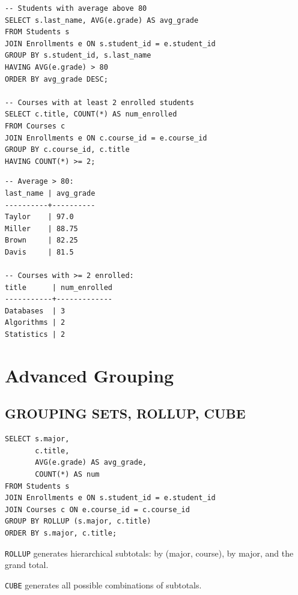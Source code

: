 \begin{codeblock}[title=\textbf{Filtering with HAVING}]
\begin{verbatim}
-- Students with average above 80
SELECT s.last_name, AVG(e.grade) AS avg_grade
FROM Students s
JOIN Enrollments e ON s.student_id = e.student_id
GROUP BY s.student_id, s.last_name
HAVING AVG(e.grade) > 80
ORDER BY avg_grade DESC;

-- Courses with at least 2 enrolled students
SELECT c.title, COUNT(*) AS num_enrolled
FROM Courses c
JOIN Enrollments e ON c.course_id = e.course_id
GROUP BY c.course_id, c.title
HAVING COUNT(*) >= 2;
\end{verbatim}
\end{codeblock}

\begin{codeoutput}
\begin{verbatim}
-- Average > 80:
last_name | avg_grade
----------+----------
Taylor    | 97.0
Miller    | 88.75
Brown     | 82.25
Davis     | 81.5

-- Courses with >= 2 enrolled:
title      | num_enrolled
-----------+-------------
Databases  | 3
Algorithms | 2
Statistics | 2
\end{verbatim}
\end{codeoutput}

\section{Advanced Grouping}

\subsection{GROUPING SETS, ROLLUP, CUBE}

\begin{codeblock}[title=\textbf{ROLLUP --- Hierarchical Subtotals (PostgreSQL)}]
\begin{verbatim}
SELECT s.major,
       c.title,
       AVG(e.grade) AS avg_grade,
       COUNT(*) AS num
FROM Students s
JOIN Enrollments e ON s.student_id = e.student_id
JOIN Courses c ON e.course_id = c.course_id
GROUP BY ROLLUP (s.major, c.title)
ORDER BY s.major, c.title;
\end{verbatim}
\end{codeblock}

\texttt{ROLLUP} generates hierarchical subtotals: by (major, course),
by major, and the grand total.

\texttt{CUBE} generates all possible combinations of subtotals.


